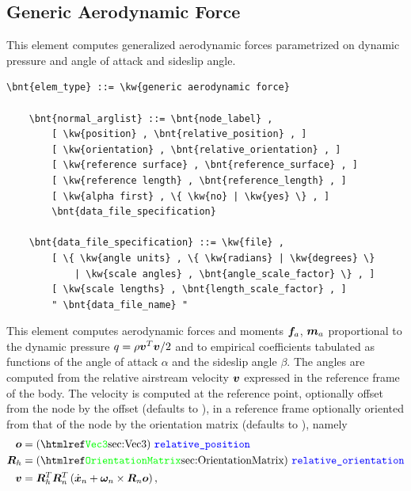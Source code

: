 \subsection{Generic Aerodynamic Force}
\label{sec:EL:AERO:GAF}
This element computes generalized aerodynamic forces parametrized
on dynamic pressure and angle of attack and sideslip angle.
\begin{Verbatim}[commandchars=\\\{\}]
    \bnt{elem_type} ::= \kw{generic aerodynamic force}

    \bnt{normal_arglist} ::= \bnt{node_label} ,
        [ \kw{position} , \bnt{relative_position} , ]
        [ \kw{orientation} , \bnt{relative_orientation} , ]
        [ \kw{reference surface} , \bnt{reference_surface} , ]
        [ \kw{reference length} , \bnt{reference_length} , ]
        [ \kw{alpha first} , \{ \kw{no} | \kw{yes} \} , ]
        \bnt{data_file_specification}

    \bnt{data_file_specification} ::= \kw{file} ,
        [ \{ \kw{angle units} , \{ \kw{radians} | \kw{degrees} \}
            | \kw{scale angles} , \bnt{angle_scale_factor} \} , ]
        [ \kw{scale lengths} , \bnt{length_scale_factor} , ]
        " \bnt{data_file_name} "
\end{Verbatim}
This element computes aerodynamic forces and moments $\boldsymbol{f}_a$, $\boldsymbol{m}_a$
proportional to the dynamic pressure $q=\rho \boldsymbol{v}^T \boldsymbol{v}/2$
and to empirical coefficients tabulated as functions
of the angle of attack $\alpha$ and the sideslip angle $\beta$.
The angles are computed from the relative airstream velocity $\boldsymbol{v}$
expressed in the reference frame of the body.
The velocity is computed at the reference point, optionally offset
from the node  by the offset 
(defaults to ), in a reference frame optionally oriented
from that of the node  by the orientation matrix
 (defaults to ), namely
\begin{subequations}
\begin{align}
	\TT{o} &= \text{(\hty{Vec3})} \ \nt{relative\_position}
	\\
	\TT{R}_h &= \text{(\hty{OrientationMatrix})}\ \nt{relative\_orientation}
	\\
	\TT{v} &= \TT{R}_h^T \TT{R}_n^T \plbr{
		\dot{\T{x}}_n + \T{\omega}_n \times \TT{R}_n \TT{o}
	}
	,
\end{align}
\end{subequations}
